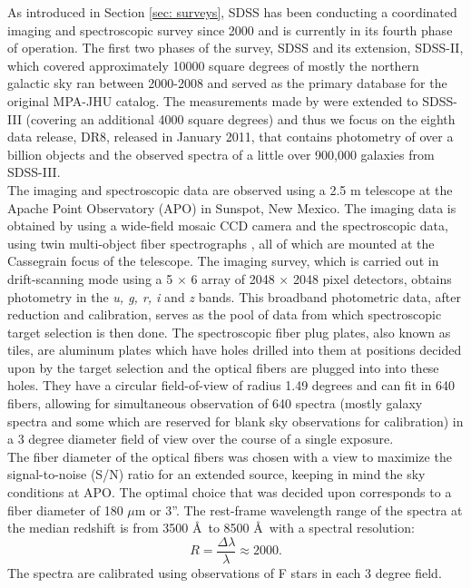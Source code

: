 As introduced in Section \ref{sec: surveys}, SDSS has been conducting a coordinated imaging and spectroscopic survey since 2000 and is currently in its fourth phase of operation. The first two phases of the survey, SDSS and its extension, SDSS-II, which covered approximately 10000 square degrees of mostly the northern galactic sky ran between 2000-2008 and served as the primary database for the original MPA-JHU catalog. The measurements made by \citet{brinchmann_physical_2004, kauffmann_stellar_2003, tremonti_origin_2004} were extended to SDSS-III (covering an additional 4000 square degrees) and thus we focus on the eighth data release, DR8, released in January 2011, that contains photometry of over a billion objects and the observed spectra of a little over 900,000 galaxies \citep{2009ApJS..182..543A} from SDSS-III.\\

The imaging and spectroscopic data are observed using a 2.5 m telescope at the Apache Point Observatory (APO) in Sunspot, New Mexico. The imaging data is obtained by using a wide-field mosaic CCD camera and the spectroscopic data, using twin multi-object fiber spectrographs  \citep{smee_multi-object_2013}, all of which are mounted at the Cassegrain focus of the telescope. The imaging survey, which is carried out in drift-scanning mode using a 5 $\times$ 6 array of 2048 $\times$ 2048 pixel detectors, obtains photometry in the \emph{u, g, r, i} and \emph{z} bands. This broadband photometric data, after reduction and calibration, serves as the pool of data from which spectroscopic target selection is then done. The spectroscopic fiber plug plates, also known as tiles, are aluminum plates which have holes drilled into them at positions decided upon by the target selection and the optical fibers are plugged into into these holes. They have a circular field-of-view of radius 1.49 degrees and can fit in 640 fibers, allowing for simultaneous observation of 640 spectra (mostly galaxy spectra and some which are reserved for blank sky observations for calibration) in a 3 degree diameter field of view over the course of a single exposure.\\

The fiber diameter of the optical fibers was chosen with a view to maximize the signal-to-noise (S/N) ratio for an extended source, keeping in mind the sky conditions at APO. The optimal choice that was decided upon corresponds to a fiber diameter of 180 $\mu$m or 3''. The rest-frame wavelength range of the spectra at the median redshift is from 3500 \AA\ to 8500 \AA\ with a spectral resolution:\\ $$R = \frac{\Delta \lambda}{\lambda} \approx 2000.$$ The spectra are calibrated using observations of F stars in each 3 degree field.\\

